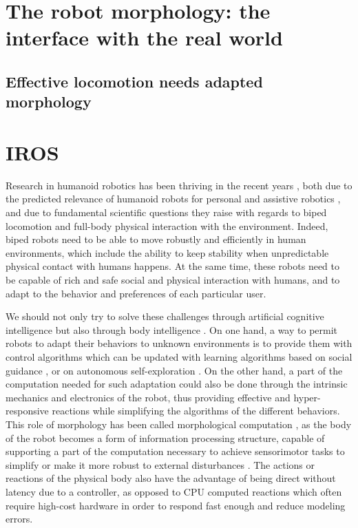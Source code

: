 \section{The robot morphology: the interface with the real world} %

\subsection{Effective locomotion needs adapted morphology} %

\section{IROS} %
Research in humanoid robotics has been thriving in the recent years \cite{hirai1998development} \cite{kaneko2008humanoid}, both due to the predicted relevance of humanoid robots for personal and assistive robotics \cite{tapus2007socially}, and due to fundamental scientific questions they raise with regards to biped locomotion and full-body physical interaction with the environment. Indeed, biped robots need to be able to move robustly and efficiently in human environments, which include the ability to keep stability when unpredictable physical contact with humans happens. At the same time, these robots need to be capable of rich and safe social and physical interaction with humans, and to adapt to the behavior and preferences of each particular user.

We should not only try to solve these challenges through artificial cognitive intelligence but also through body intelligence \cite{Pfeifer06}. On one hand, a way to permit robots to adapt their behaviors to unknown environments is to provide them with control algorithms which can be updated with learning algorithms based on social guidance \cite{billard2008robot}, or on autonomous self-exploration \cite{Baranes2012RAS}\cite{lapeyre2011maturational}. On the other hand, a part of the computation needed for such adaptation could also be done through the intrinsic mechanics and electronics of the robot, thus providing effective and hyper-responsive reactions while simplifying the algorithms of the different behaviors. This role of morphology has been called morphological computation \cite{pfeifer2005morphological}, as the body of the robot becomes a form of information processing structure, capable of supporting a part of the computation necessary to achieve sensorimotor tasks to simplify or make it more robust to external disturbances \cite{pfeifer2005morphological}\cite{Pfeifer07}. The actions or reactions of the physical body also have the advantage of being direct without latency due to a controller, as opposed to CPU computed reactions which often require high-cost hardware in order to respond fast enough and reduce modeling errors.



